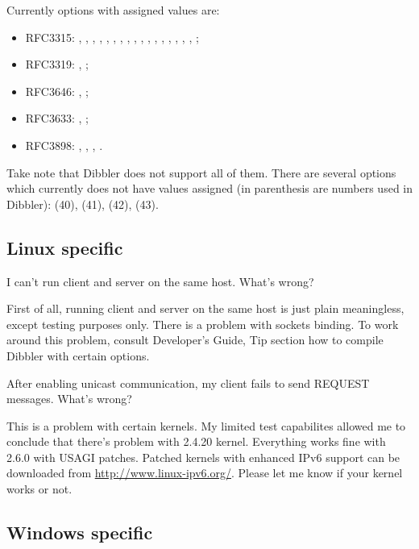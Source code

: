 Currently options with assigned values are: 
\begin{itemize}
\item RFC3315: ,
, , , ,
, , ,
, , , ,
, , ,
, , ;
\item RFC3319:
, ;
\item RFC3646: ,
;
\item RFC3633: , ;
\item RFC3898:
, , ,
. 

\end{itemize}
Take note that Dibbler does not support all of
them. There are several options which currently does not have values
assigned (in parenthesis are numbers used in Dibbler):
 (40),  (41),  (42),
 (43).

\subsection{Linux specific}

\Q I can't run client and server on the same host. What's wrong?

\A First of all, running client and server on the same host is just
plain meaningless, except testing purposes only. There is a problem
with sockets binding. To work around this problem, consult Developer's
Guide, Tip section how to compile Dibbler with certain options.

\Q After enabling unicast communication, my client fails to send
REQUEST messages. What's wrong?

\A This is a problem with certain kernels. My limited test capabilites
allowed me to conclude that there's problem with 2.4.20
kernel. Everything works fine with 2.6.0 with USAGI patches. Patched 
kernels with enhanced IPv6 support can be downloaded from
\url{http://www.linux-ipv6.org/}. Please let me know if your kernel
works or not.

\subsection{Windows specific}

